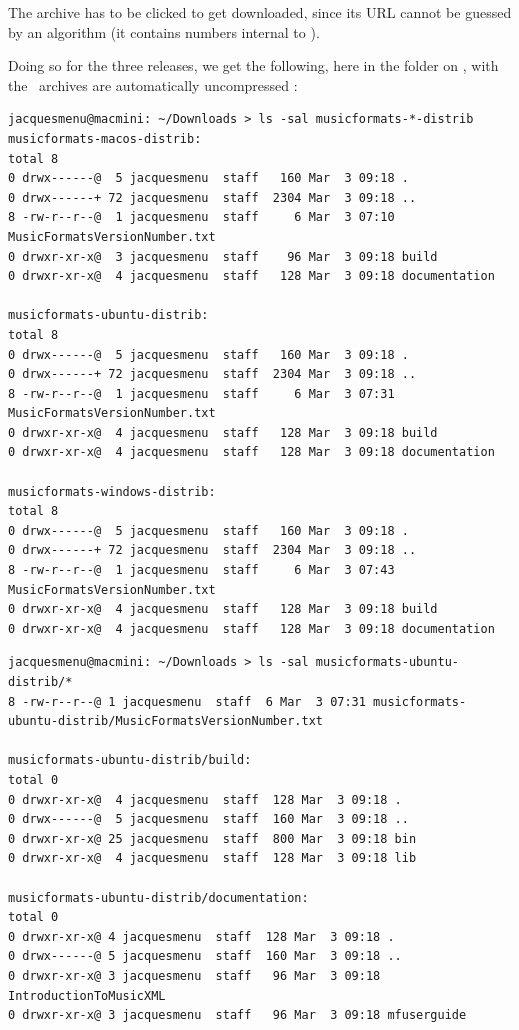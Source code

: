 The  archive has to be clicked to get downloaded, since its URL cannot be guessed by an algorithm (it contains numbers internal to \github).

Doing so for the three releases, we get the following, here in the  folder on \MacOS, with the \zip\ archives are automatically uncompressed :
\begin{lstlisting}[language=Terminal]
jacquesmenu@macmini: ~/Downloads > ls -sal musicformats-*-distrib
musicformats-macos-distrib:
total 8
0 drwx------@  5 jacquesmenu  staff   160 Mar  3 09:18 .
0 drwx------+ 72 jacquesmenu  staff  2304 Mar  3 09:18 ..
8 -rw-r--r--@  1 jacquesmenu  staff     6 Mar  3 07:10 MusicFormatsVersionNumber.txt
0 drwxr-xr-x@  3 jacquesmenu  staff    96 Mar  3 09:18 build
0 drwxr-xr-x@  4 jacquesmenu  staff   128 Mar  3 09:18 documentation

musicformats-ubuntu-distrib:
total 8
0 drwx------@  5 jacquesmenu  staff   160 Mar  3 09:18 .
0 drwx------+ 72 jacquesmenu  staff  2304 Mar  3 09:18 ..
8 -rw-r--r--@  1 jacquesmenu  staff     6 Mar  3 07:31 MusicFormatsVersionNumber.txt
0 drwxr-xr-x@  4 jacquesmenu  staff   128 Mar  3 09:18 build
0 drwxr-xr-x@  4 jacquesmenu  staff   128 Mar  3 09:18 documentation

musicformats-windows-distrib:
total 8
0 drwx------@  5 jacquesmenu  staff   160 Mar  3 09:18 .
0 drwx------+ 72 jacquesmenu  staff  2304 Mar  3 09:18 ..
8 -rw-r--r--@  1 jacquesmenu  staff     6 Mar  3 07:43 MusicFormatsVersionNumber.txt
0 drwxr-xr-x@  4 jacquesmenu  staff   128 Mar  3 09:18 build
0 drwxr-xr-x@  4 jacquesmenu  staff   128 Mar  3 09:18 documentation
\end{lstlisting}

\begin{lstlisting}[language=Terminal]
jacquesmenu@macmini: ~/Downloads > ls -sal musicformats-ubuntu-distrib/*
8 -rw-r--r--@ 1 jacquesmenu  staff  6 Mar  3 07:31 musicformats-ubuntu-distrib/MusicFormatsVersionNumber.txt

musicformats-ubuntu-distrib/build:
total 0
0 drwxr-xr-x@  4 jacquesmenu  staff  128 Mar  3 09:18 .
0 drwx------@  5 jacquesmenu  staff  160 Mar  3 09:18 ..
0 drwxr-xr-x@ 25 jacquesmenu  staff  800 Mar  3 09:18 bin
0 drwxr-xr-x@  4 jacquesmenu  staff  128 Mar  3 09:18 lib

musicformats-ubuntu-distrib/documentation:
total 0
0 drwxr-xr-x@ 4 jacquesmenu  staff  128 Mar  3 09:18 .
0 drwx------@ 5 jacquesmenu  staff  160 Mar  3 09:18 ..
0 drwxr-xr-x@ 3 jacquesmenu  staff   96 Mar  3 09:18 IntroductionToMusicXML
0 drwxr-xr-x@ 3 jacquesmenu  staff   96 Mar  3 09:18 mfuserguide
\end{lstlisting}

